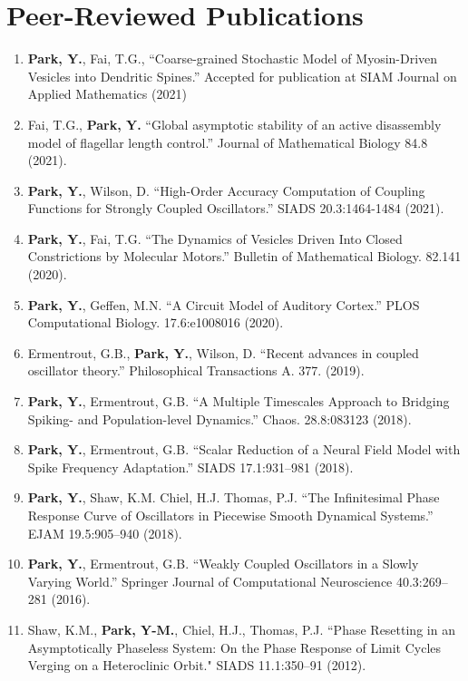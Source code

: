 \documentclass[a4paper,10pt]{article}
\begin{document}
\section{Peer-Reviewed Publications}
\noindent
\renewcommand\labelitemi{\tiny$\bullet$}
\begin{enumerate}[leftmargin=.225in,rightmargin=.1in,itemsep=2pt]
    \item \textbf{Park, Y.}, Fai, T.G.,  ``Coarse-grained Stochastic Model of Myosin-Driven Vesicles into Dendritic Spines.'' Accepted for publication at SIAM Journal on Applied Mathematics (2021) %
    \item Fai, T.G., \textbf{Park, Y.} ``Global asymptotic stability of an active disassembly model of flagellar length control.'' Journal of Mathematical Biology 84.8 (2021). %
    \item \textbf{Park, Y.}, Wilson, D. ``High-Order Accuracy Computation of Coupling Functions for Strongly Coupled Oscillators.'' SIADS 20.3:1464-1484 (2021).
    \item \textbf{Park, Y.}, Fai, T.G. ``The Dynamics of Vesicles Driven Into Closed Constrictions by Molecular Motors.'' Bulletin of Mathematical Biology. 82.141 (2020).
    \item \textbf{Park, Y.}, Geffen, M.N. ``A Circuit Model of Auditory Cortex.'' PLOS Computational Biology. 17.6:e1008016 (2020).
    \item Ermentrout, G.B.,  \textbf{Park, Y.}, Wilson, D. ``Recent advances in coupled oscillator theory.'' Philosophical Transactions A. 377. (2019).
    \item \textbf{Park, Y.}, Ermentrout, G.B. ``A Multiple Timescales Approach to Bridging Spiking- and Population-level Dynamics.'' Chaos. 28.8:083123 (2018).
    \item \textbf{Park, Y.}, Ermentrout, G.B. ``Scalar Reduction of a Neural Field Model with Spike Frequency Adaptation.'' SIADS 17.1:931--981 (2018).
    \item \textbf{Park, Y.}, Shaw, K.M. Chiel, H.J. Thomas, P.J. ``The Infinitesimal Phase Response Curve of Oscillators in Piecewise Smooth Dynamical Systems.'' EJAM 19.5:905--940 (2018).
    \item \textbf{Park, Y.}, Ermentrout, G.B. ``Weakly Coupled Oscillators in a Slowly Varying World.'' Springer Journal of Computational Neuroscience 40.3:269--281 (2016).
    \item Shaw, K.M., \textbf{Park, Y-M.}, Chiel, H.J., Thomas, P.J. ``Phase Resetting in an Asymptotically Phaseless System: On the Phase Response of Limit Cycles Verging on a Heteroclinic Orbit." SIADS 11.1:350--91 (2012).
\end{enumerate}
\end{document}
